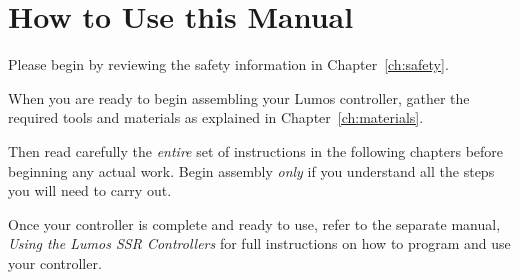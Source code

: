 \section{How to Use this Manual}
Please begin by reviewing the safety information in Chapter~\ref{ch:safety}.  

When you are ready to begin assembling your Lumos controller, gather the required tools and materials
as explained in Chapter~\ref{ch:materials}.  

Then read carefully the \emph{entire} set of instructions in the following chapters before
beginning any actual work.  Begin assembly \emph{only} if you understand all the steps you will need
to carry out.

Once your controller is complete and ready to use, refer to the separate manual,
\emph{Using the Lumos SSR Controllers} for full instructions on how to program
and use your controller.
